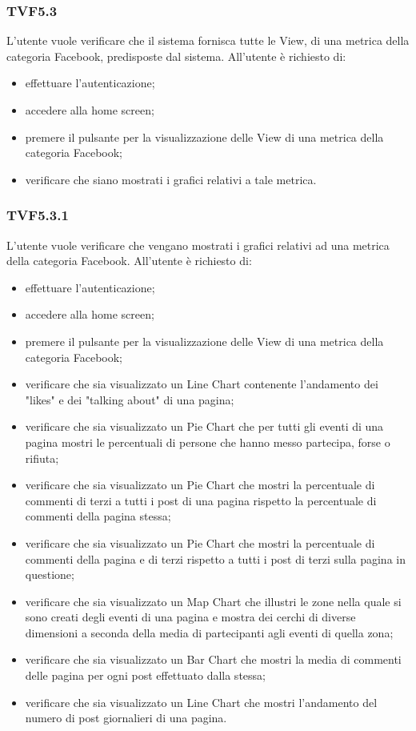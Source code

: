 		\subsubsection{TVF5.3}
			L'utente vuole verificare che il sistema fornisca tutte le View, di una metrica della categoria Facebook, predisposte dal sistema. All'utente è richiesto di:
			\begin{itemize}
				\item effettuare l'autenticazione;
				\item accedere alla home screen;
				\item premere il pulsante per la visualizzazione delle View di una metrica della categoria Facebook;
				\item verificare che siano mostrati i grafici relativi a tale metrica.
			\end{itemize}
			
		\subsubsection{TVF5.3.1}
			L'utente vuole verificare che vengano mostrati i grafici relativi ad una metrica della categoria Facebook. All'utente è richiesto di:
			\begin{itemize}
				\item effettuare l'autenticazione;
				\item accedere alla home screen;
				\item premere il pulsante per la visualizzazione delle View di una metrica della categoria Facebook;
				\item verificare che sia visualizzato un Line Chart contenente l'andamento dei "likes" e dei "talking about" di una pagina;
				\item verificare che sia visualizzato un Pie Chart che per tutti gli eventi di una pagina mostri le percentuali di persone che hanno messo partecipa, forse o rifiuta;
				\item verificare che sia visualizzato un Pie Chart che mostri la percentuale di commenti di terzi a tutti i post di una pagina rispetto la percentuale di commenti della pagina stessa;
				\item verificare che sia visualizzato un Pie Chart che mostri la percentuale di commenti della pagina e di terzi rispetto a tutti i post di terzi sulla pagina in questione;
				\item verificare che sia visualizzato un Map Chart che illustri le zone nella quale si sono creati degli eventi di una pagina e mostra dei cerchi di diverse dimensioni a seconda della media di partecipanti agli eventi di quella zona;
				\item verificare che sia visualizzato un Bar Chart che mostri la media di commenti delle pagina per ogni post effettuato dalla stessa;
				\item verificare che sia visualizzato un Line Chart che mostri l'andamento del numero di post giornalieri di una pagina.
			\end{itemize}
			
